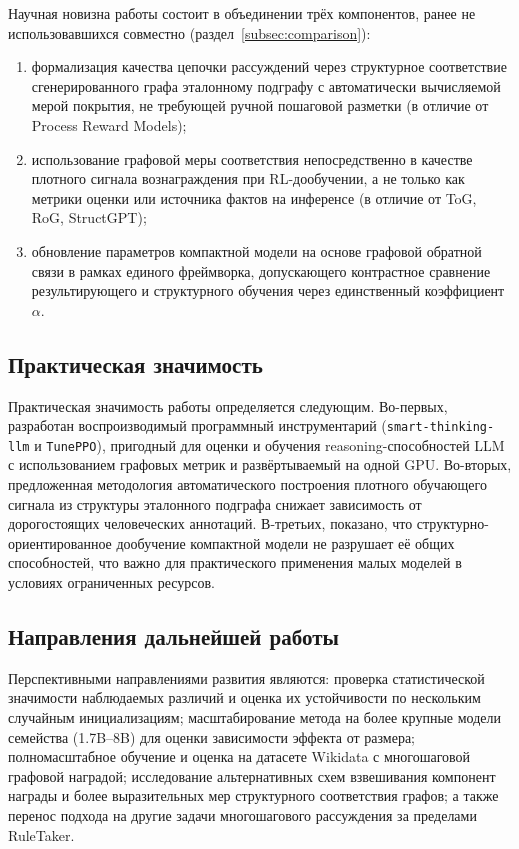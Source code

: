 Научная новизна работы состоит в объединении трёх компонентов, ранее не использовавшихся совместно (раздел~\ref{subsec:comparison}):
\begin{enumerate}
    \setlength{\itemsep}{\smallskipamount}
    \item формализация качества цепочки рассуждений через структурное соответствие сгенерированного графа эталонному подграфу с автоматически вычисляемой мерой покрытия, не требующей ручной пошаговой разметки (в отличие от Process Reward Models);
    \item использование графовой меры соответствия непосредственно в качестве плотного сигнала вознаграждения при RL-дообучении, а не только как метрики оценки или источника фактов на инференсе (в отличие от ToG, RoG, StructGPT);
    \item обновление параметров компактной модели на основе графовой обратной связи в рамках единого фреймворка, допускающего контрастное сравнение результирующего и структурного обучения через единственный коэффициент~$\alpha$.
\end{enumerate}

\subsection{Практическая значимость}
\label{subsec:conclusion-practical}

Практическая значимость работы определяется следующим. Во-первых, разработан воспроизводимый программный инструментарий (\texttt{smart-thinking-llm} и \texttt{TunePPO}), пригодный для оценки и обучения reasoning-способностей LLM с использованием графовых метрик и развёртываемый на одной GPU. Во-вторых, предложенная методология автоматического построения плотного обучающего сигнала из структуры эталонного подграфа снижает зависимость от дорогостоящих человеческих аннотаций. В-третьих, показано, что структурно-ориентированное дообучение компактной модели не разрушает её общих способностей, что важно для практического применения малых моделей в условиях ограниченных ресурсов.

\subsection{Направления дальнейшей работы}
\label{subsec:conclusion-future}

Перспективными направлениями развития являются: проверка статистической значимости наблюдаемых различий и оценка их устойчивости по нескольким случайным инициализациям; масштабирование метода на более крупные модели семейства (1.7B--8B) для оценки зависимости эффекта от размера; полномасштабное обучение и оценка на датасете Wikidata с многошаговой графовой наградой; исследование альтернативных схем взвешивания компонент награды и более выразительных мер структурного соответствия графов; а также перенос подхода на другие задачи многошагового рассуждения за пределами RuleTaker.
